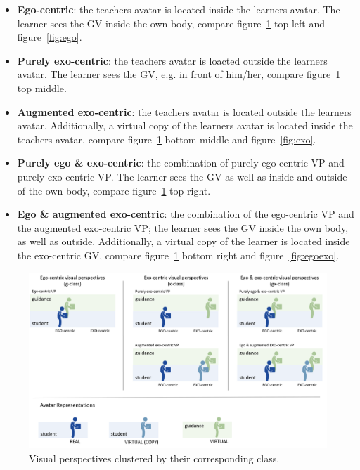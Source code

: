 \begin{itemize}
	\item \textbf{Ego-centric}: the teachers avatar is located inside the learners avatar. The learner sees the GV inside the own body, compare figure~\ref{fig:perspectives} top left and figure~\ref{fig:ego}.
	\item \textbf{Purely exo-centric}: the teachers avatar is loacted outside the learners avatar. The learner sees the GV, e.g. in front of him/her, compare figure~\ref{fig:perspectives} top middle.
	\item \textbf{Augmented exo-centric}: the teachers avatar is located outside the learners avatar. Additionally, a virtual copy of the learners avatar is located inside the teachers avatar, compare figure~\ref{fig:perspectives} bottom middle and figure~\ref{fig:exo}.
	\item \textbf{Purely ego \& exo-centric}: the combination of purely ego-centric VP and purely exo-centric VP. The learner sees the GV as well as inside and outside of the own body, compare figure~\ref{fig:perspectives} top right.
	\item \textbf{Ego \& augmented exo-centric}: the combination of the ego-centric VP and the augmented exo-centric VP; the learner sees the GV inside the own body, as well as outside. Additionally, a virtual copy of the learner is located inside the exo-centric GV, compare figure~\ref{fig:perspectives} bottom right and figure~\ref{fig:egoexo}.	
\end{itemize}
\begin{figure}[htb]
	\centering
	\includegraphics[width=\textwidth]{figures/perspectives_new.png}
	\caption[Visual perspectives]{Visual perspectives clustered by their corresponding class.}
	\label{fig:perspectives}
\end{figure}

